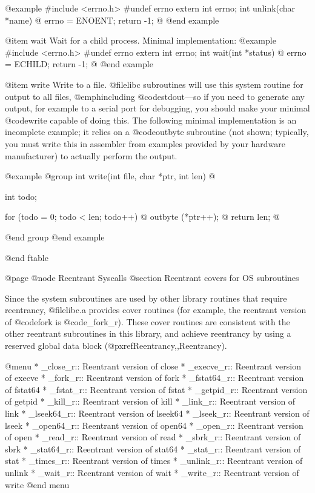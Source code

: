 @example
#include <errno.h>
#undef errno
extern int errno;
int unlink(char *name) @{
  errno = ENOENT;
  return -1; 
@}
@end example

@item wait
Wait for a child process.  Minimal implementation:
@example
#include <errno.h>
#undef errno
extern int errno;
int wait(int *status) @{
  errno = ECHILD;
  return -1;
@}
@end example

@item write
Write to a file.  @file{libc} subroutines will use this
system routine for output to all files, @emph{including}
@code{stdout}---so if you need to generate any output, for example to a
serial port for debugging, you should make your minimal @code{write}
capable of doing this.  The following minimal implementation is an
incomplete example; it relies on a @code{outbyte} subroutine (not
shown; typically, you must write this in assembler from examples
provided by your hardware manufacturer) to actually perform the output.

@example
@group
int write(int file, char *ptr, int len) @{
  int todo;

  for (todo = 0; todo < len; todo++) @{
    outbyte (*ptr++);
  @}
  return len;
@}
@end group
@end example

@end ftable

@page
@node Reentrant Syscalls
@section Reentrant covers for OS subroutines

Since the system subroutines are used by other library routines that
require reentrancy, @file{libc.a} provides cover routines (for example,
the reentrant version of @code{fork} is @code{_fork_r}).  These cover
routines are consistent with the other reentrant subroutines in this
library, and achieve reentrancy by using a reserved global data block
(@pxref{Reentrancy,,Reentrancy}).

@menu
* _close_r::	Reentrant version of close
* _execve_r::	Reentrant version of execve
* _fork_r::	Reentrant version of fork
* _fstat64_r::	Reentrant version of fstat64
* _fstat_r::	Reentrant version of fstat
* _getpid_r::	Reentrant version of getpid
* _kill_r::	Reentrant version of kill
* _link_r::	Reentrant version of link
* _lseek64_r::	Reentrant version of lseek64
* _lseek_r::	Reentrant version of lseek
* _open64_r::	Reentrant version of open64
* _open_r::	Reentrant version of open
* _read_r::	Reentrant version of read
* _sbrk_r::	Reentrant version of sbrk
* _stat64_r::	Reentrant version of stat64
* _stat_r::	Reentrant version of stat
* _times_r::	Reentrant version of times
* _unlink_r::	Reentrant version of unlink
* _wait_r::	Reentrant version of wait
* _write_r::	Reentrant version of write
@end menu

